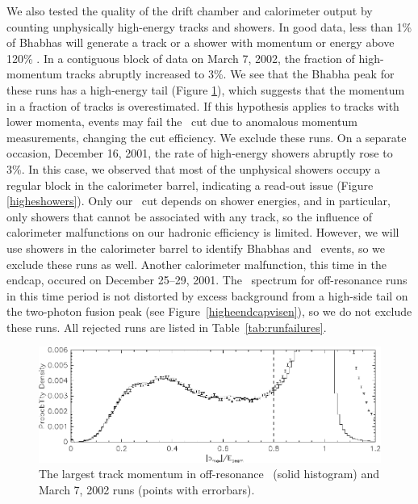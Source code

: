 \documentclass{cornell}
\begin{document}
We also tested the quality of the drift chamber and calorimeter output
by counting unphysically high-energy tracks and showers.  In good
data, less than 1\% of Bhabhas will generate a track or a shower with
momentum or energy above 120\% \ebeam.  In a contiguous block of data
on March 7, 2002, the fraction of high-momentum tracks abruptly
increased to 3\%.  We see that the Bhabha peak for these runs has a
high-energy tail (Figure \ref{highptracks}), which suggests that the
momentum in a fraction of tracks is overestimated.  If this hypothesis
applies to tracks with lower momenta, events may fail the \pmax\ cut
due to anomalous momentum measurements, changing the cut efficiency.
We exclude these runs.  On a separate occasion, December 16, 2001, the
rate of high-energy showers abruptly rose to 3\%.  In this case, we
observed that most of the unphysical showers occupy a regular block in
the calorimeter barrel, indicating a read-out issue (Figure
\ref{higheshowers}).  Only our \visen\ cut depends on shower energies,
and in particular, only showers that cannot be associated with any
track, so the influence of calorimeter malfunctions on our hadronic
efficiency is limited.  However, we will use showers in the
calorimeter barrel to identify Bhabhas and \gamgam\ events, so we
exclude these runs as well.  Another calorimeter malfunction, this
time in the endcap, occured on December 25--29, 2001.  The \visen\
spectrum for off-resonance runs in this time period is not distorted
by excess background from a high-side tail on the two-photon fusion
peak (see Figure~\ref{higheendcapvisen}), so we do not exclude these
runs.  All rejected runs are listed in Table~\ref{tab:runfailures}.

\begin{figure}[p]
  \begin{center}
    \includegraphics[width=0.85\linewidth]{newplots/highptracks}
  \end{center}
  \caption[Distribution of largest track momenta on March 7,
  2002]{\label{highptracks} The largest track momentum in
  off-resonance \us\ (solid histogram) and March 7, 2002 runs (points
  with errorbars).}
\end{figure}
\end{document}
